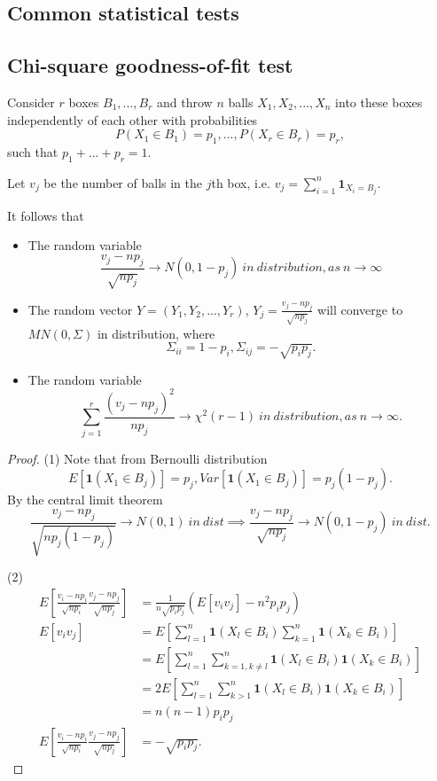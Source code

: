 \begin{refsection}
\section{Common statistical tests}

\subsection{Chi-square goodness-of-fit test}



\begin{theorem}\label{ch:theory-of-statistics:th:PearsonTheorem}
	Consider $r$ boxes $B_1,...,B_r$ and throw $n$ balls $X_1,X_2,...,X_n$ into these boxes independently of each other with probabilities $$P(X_1\in B_1) = p_1,..., P(X_r \in B_r) = p_r,$$
	such that $p_1+...+p_r = 1$. 
	
	Let $v_j$ be the number of balls in the $j$th box, i.e. $v_j = \sum_{i=1}^n \bm{1}_{X_i = B_j}.$
	
	It follows that 
	\begin{itemize}
		\item The random variable
		$$\frac{v_j - np_j}{\sqrt{np_j}} \to N(0,1-p_j) ~in~distribution, as~ n \to \infty $$
		\item The random vector $Y=(Y_1,Y_2,...,Y_r)$, $Y_j = \frac{v_j - np_j}{\sqrt{np_j}}$ will converge to $MN(0,\Sigma)$ in distribution, where
		$$\Sigma_{ii} = 1- p_i, \Sigma_{ij} = -\sqrt{p_ip_j}.$$
		\item The random variable 
		$$\sum_{j=1}^r \frac{(v_j - np_j)^2}{np_j}\to \chi^2(r-1) ~in~distribution, as~ n \to \infty.$$
	\end{itemize}
\end{theorem}
\begin{proof}
	(1) Note that from Bernoulli distribution $$E[\bm{1}(X_1\in B_j)] = p_j, Var[\bm{1}(X_1\in B_j)] = p_j(1-p_j).$$
	By the central limit theorem
	$$\frac{v_j - np_j}{\sqrt{np_j(1-p_j)}} \to N(0,1) ~in~dist \implies \frac{v_j - np_j}{\sqrt{np_j}} \to N(0,1-p_j) ~in~dist.$$
	
	(2)
	\begin{align*}
	E[\frac{v_i - np_i}{\sqrt{np_i}}\frac{v_j - np_j}{\sqrt{np_j}}] &= \frac{1}{n\sqrt{p_ip_j}}(E[v_iv_j] - n^2p_ip_j) \\
	E[v_iv_j] &= E[\sum_{l=1}^n \bm{1}(X_l\in B_i)\sum_{k=1}^n \bm{1}(X_k\in B_i)] \\
	&=E[\sum_{l=1}^n \sum_{k=1,k\neq l}^n\bm{1}(X_l\in B_i) \bm{1}(X_k\in B_i)] \\
	&=2E[\sum_{l=1}^n \sum_{k>1}^n\bm{1}(X_l\in B_i) \bm{1}(X_k\in B_i)] \\
	&=n(n-1)p_ip_j \\
	E[\frac{v_i - np_i}{\sqrt{np_i}}\frac{v_j - np_j}{\sqrt{np_j}}] & = -\sqrt{p_ip_j}.
	\end{align*}
	

\end{proof}
\end{refsection}
